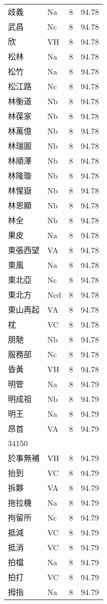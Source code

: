 \documentclass[twocolumn]{book}
\begin{document}
\begin{supertabular}{llrr}
歧義 & Na & 8 &  94.78\\
武昌 & Nc & 8 &  94.78\\
欣 & VH & 8 &  94.78\\
松林 & Na & 8 &  94.78\\
松竹 & Na & 8 &  94.78\\
松江路 & Nc & 8 &  94.78\\
林衡道 & Nb & 8 &  94.78\\
林葆家 & Nb & 8 &  94.78\\
林萬億 & Nb & 8 &  94.78\\
林瑞圖 & Nb & 8 &  94.78\\
林順澤 & Nb & 8 &  94.78\\
林隆璇 & Nb & 8 &  94.78\\
林惺嶽 & Nb & 8 &  94.78\\
林恩顯 & Nb & 8 &  94.78\\
林全 & Nb & 8 &  94.78\\
果皮 & Na & 8 &  94.78\\
東張西望 & VA & 8 &  94.78\\
東風 & Na & 8 &  94.78\\
東北亞 & Nc & 8 &  94.78\\
東北方 & Ncd & 8 &  94.78\\
東山再起 & VA & 8 &  94.78\\
枕 & VC & 8 &  94.78\\
朋馳 & Nb & 8 &  94.78\\
服務部 & Nc & 8 &  94.78\\
昏黃 & VH & 8 &  94.78\\
明管 & Na & 8 &  94.79\\
明成祖 & Nb & 8 &  94.79\\
明王 & Na & 8 &  94.79\\
昂首 & VA & 8 &  94.79\\
34150\\
於事無補 & VH & 8 &  94.79\\
抬到 & VC & 8 &  94.79\\
拆夥 & VA & 8 &  94.79\\
拖拉機 & Na & 8 &  94.79\\
拘留所 & Nc & 8 &  94.79\\
抵減 & VC & 8 &  94.79\\
抵消 & VC & 8 &  94.79\\
拍檔 & Na & 8 &  94.79\\
拍打 & VC & 8 &  94.79\\
拇指 & Na & 8 &  94.79\\

\end{supertabular}
\end{document}
